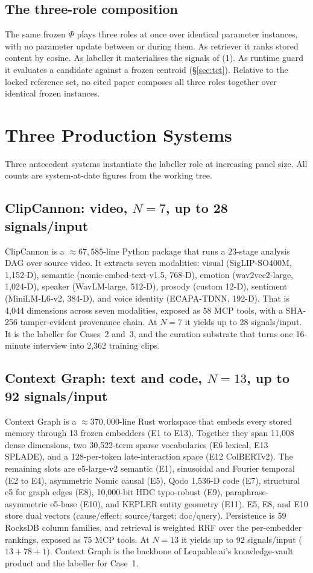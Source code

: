 \documentclass[10pt,twocolumn]{article}
\begin{document}
\subsection{The three-role composition}
The same frozen $\Phi$ plays three roles at once over identical parameter
instances, with no parameter update between or during them. As retriever it ranks
stored content by cosine. As labeller it materialises the signals of (1). As
runtime guard it evaluates a candidate against a frozen centroid (\S\ref{sec:tct}).
Relative to the locked reference set, no cited paper composes all three roles
together over identical frozen instances.

\section{Three Production Systems}
Three antecedent systems instantiate the labeller role at increasing panel size.
All counts are system-at-date figures from the working tree.

\subsection{ClipCannon: video, $N=7$, up to 28 signals/input}
ClipCannon is a ${\approx}67{,}585$-line Python package that runs a 23-stage
analysis DAG over source video. It extracts seven modalities: visual
(SigLIP-SO400M, 1{,}152-D), semantic (nomic-embed-text-v1.5, 768-D), emotion
(wav2vec2-large, 1{,}024-D), speaker (WavLM-large, 512-D), prosody (custom 12-D),
sentiment (MiniLM-L6-v2, 384-D), and voice identity (ECAPA-TDNN, 192-D). That is
4{,}044 dimensions across seven modalities, exposed as 58 MCP tools, with a
SHA-256 tamper-evident provenance chain. At $N=7$ it yields up to 28
signals/input. It is the labeller for Cases~2 and~3, and the curation substrate
that turns one 16-minute interview into 2{,}362 training clips.

\subsection{Context Graph: text and code, $N=13$, up to 92 signals/input}
Context Graph is a ${\approx}370{,}000$-line Rust workspace that embeds every
stored memory through 13 frozen embedders (E1 to E13). Together they span 11{,}008
dense dimensions, two 30{,}522-term sparse vocabularies (E6 lexical, E13 SPLADE),
and a 128-per-token late-interaction space (E12 ColBERTv2). The remaining slots
are e5-large-v2 semantic (E1), sinusoidal and Fourier temporal (E2 to E4),
asymmetric Nomic causal (E5), Qodo 1{,}536-D code (E7), structural e5 for graph
edges (E8), 10{,}000-bit HDC typo-robust (E9), paraphrase-asymmetric e5-base
(E10), and KEPLER entity geometry (E11). E5, E8, and E10 store dual vectors
(cause/effect; source/target; doc/query). Persistence is 59 RocksDB column
families, and retrieval is weighted RRF over the per-embedder rankings, exposed as
75 MCP tools. At $N=13$ it yields up to 92 signals/input ($13+78+1$). Context
Graph is the backbone of Leapable.ai's knowledge-vault product and the labeller
for Case~1.
\end{document}
